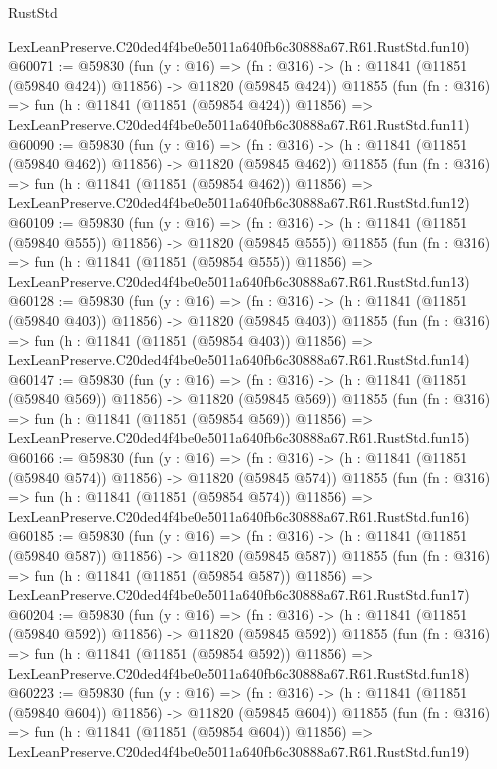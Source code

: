 \begin{lexlean}{RustStd}
\begin{coremodule}
    LexLeanPreserve.C20ded4f4be0e5011a640fb6c30888a67.R61.RustStd.fun10)
@60071 := @59830
    (fun (y : @16) =>
    (fn : @316) -> (h : @11841 (@11851 (@59840 @424)) @11856) -> @11820 (@59845 @424))
    @11855
    (fun (fn : @316) =>
    fun (h : @11841 (@11851 (@59854 @424)) @11856) =>
    LexLeanPreserve.C20ded4f4be0e5011a640fb6c30888a67.R61.RustStd.fun11)
@60090 := @59830
    (fun (y : @16) =>
    (fn : @316) -> (h : @11841 (@11851 (@59840 @462)) @11856) -> @11820 (@59845 @462))
    @11855
    (fun (fn : @316) =>
    fun (h : @11841 (@11851 (@59854 @462)) @11856) =>
    LexLeanPreserve.C20ded4f4be0e5011a640fb6c30888a67.R61.RustStd.fun12)
@60109 := @59830
    (fun (y : @16) =>
    (fn : @316) -> (h : @11841 (@11851 (@59840 @555)) @11856) -> @11820 (@59845 @555))
    @11855
    (fun (fn : @316) =>
    fun (h : @11841 (@11851 (@59854 @555)) @11856) =>
    LexLeanPreserve.C20ded4f4be0e5011a640fb6c30888a67.R61.RustStd.fun13)
@60128 := @59830
    (fun (y : @16) =>
    (fn : @316) -> (h : @11841 (@11851 (@59840 @403)) @11856) -> @11820 (@59845 @403))
    @11855
    (fun (fn : @316) =>
    fun (h : @11841 (@11851 (@59854 @403)) @11856) =>
    LexLeanPreserve.C20ded4f4be0e5011a640fb6c30888a67.R61.RustStd.fun14)
@60147 := @59830
    (fun (y : @16) =>
    (fn : @316) -> (h : @11841 (@11851 (@59840 @569)) @11856) -> @11820 (@59845 @569))
    @11855
    (fun (fn : @316) =>
    fun (h : @11841 (@11851 (@59854 @569)) @11856) =>
    LexLeanPreserve.C20ded4f4be0e5011a640fb6c30888a67.R61.RustStd.fun15)
@60166 := @59830
    (fun (y : @16) =>
    (fn : @316) -> (h : @11841 (@11851 (@59840 @574)) @11856) -> @11820 (@59845 @574))
    @11855
    (fun (fn : @316) =>
    fun (h : @11841 (@11851 (@59854 @574)) @11856) =>
    LexLeanPreserve.C20ded4f4be0e5011a640fb6c30888a67.R61.RustStd.fun16)
@60185 := @59830
    (fun (y : @16) =>
    (fn : @316) -> (h : @11841 (@11851 (@59840 @587)) @11856) -> @11820 (@59845 @587))
    @11855
    (fun (fn : @316) =>
    fun (h : @11841 (@11851 (@59854 @587)) @11856) =>
    LexLeanPreserve.C20ded4f4be0e5011a640fb6c30888a67.R61.RustStd.fun17)
@60204 := @59830
    (fun (y : @16) =>
    (fn : @316) -> (h : @11841 (@11851 (@59840 @592)) @11856) -> @11820 (@59845 @592))
    @11855
    (fun (fn : @316) =>
    fun (h : @11841 (@11851 (@59854 @592)) @11856) =>
    LexLeanPreserve.C20ded4f4be0e5011a640fb6c30888a67.R61.RustStd.fun18)
@60223 := @59830
    (fun (y : @16) =>
    (fn : @316) -> (h : @11841 (@11851 (@59840 @604)) @11856) -> @11820 (@59845 @604))
    @11855
    (fun (fn : @316) =>
    fun (h : @11841 (@11851 (@59854 @604)) @11856) =>
    LexLeanPreserve.C20ded4f4be0e5011a640fb6c30888a67.R61.RustStd.fun19)

\end{coremodule}
\end{lexlean}
